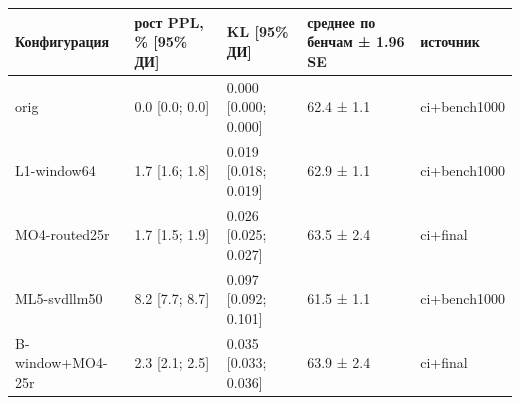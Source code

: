 \begin{tabular}{lllll}
\toprule
Конфигурация & рост PPL, \% [95\% ДИ] & KL [95\% ДИ] & среднее по бенчам ± 1.96 SE & источник \\
\midrule
orig & 0.0 [0.0; 0.0] & 0.000 [0.000; 0.000] & 62.4 ± 1.1 & ci+bench1000 \\
L1-window64 & 1.7 [1.6; 1.8] & 0.019 [0.018; 0.019] & 62.9 ± 1.1 & ci+bench1000 \\
MO4-routed25r & 1.7 [1.5; 1.9] & 0.026 [0.025; 0.027] & 63.5 ± 2.4 & ci+final \\
ML5-svdllm50 & 8.2 [7.7; 8.7] & 0.097 [0.092; 0.101] & 61.5 ± 1.1 & ci+bench1000 \\
B-window+MO4-25r & 2.3 [2.1; 2.5] & 0.035 [0.033; 0.036] & 63.9 ± 2.4 & ci+final \\
\bottomrule
\end{tabular}
